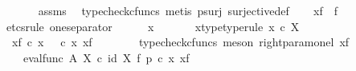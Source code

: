 \begin{isabellebody}
\ \ \ \ \isamarkupfalse%
\ assms\ \isamarkupfalse%
\ {\isacharparenleft}{\kern0pt}typecheck{\isacharunderscore}{\kern0pt}cfuncs{\isacharcomma}{\kern0pt}\ metis\ p{\isacharunderscore}{\kern0pt}surj\ surjective{\isacharunderscore}{\kern0pt}def{}{\isacharparenright}{\kern0pt}\isanewline
\ \ \isamarkupfalse%
\ {\isachardoublequoteopen}{\isasymphi}\isactrlbsub {\isacharbrackleft}{\kern0pt}{\isacharminus}{\kern0pt}{\isacharcomma}{\kern0pt}x{\isacharunderscore}{\kern0pt}f{\isacharbrackright}{\kern0pt}\isactrlesub \ {\isacharequal}{\kern0pt}\ f{\isachardoublequoteclose}\isanewline
\ \ \isamarkupfalse%
{\isacharparenleft}{\kern0pt}etcs{\isacharunderscore}{\kern0pt}rule\ one{\isacharunderscore}{\kern0pt}separator{\isacharparenright}{\kern0pt}\isanewline
\ \ \ \ \isamarkupfalse%
\ x\ \isanewline
\ \ \ \ \isamarkupfalse%
\ x{\isacharunderscore}{\kern0pt}type{\isacharbrackleft}{\kern0pt}type{\isacharunderscore}{\kern0pt}rule{\isacharbrackright}{\kern0pt}{\isacharcolon}{\kern0pt}\ {\isachardoublequoteopen}x\ {\isasymin}\isactrlsub c\ X{\isachardoublequoteclose}\isanewline
\ \ \ \ \isamarkupfalse%
\ {\isachardoublequoteopen}{\isasymphi}\isactrlbsub {\isacharbrackleft}{\kern0pt}{\isacharminus}{\kern0pt}{\isacharcomma}{\kern0pt}x{\isacharunderscore}{\kern0pt}f{\isacharbrackright}{\kern0pt}\isactrlesub \ {\isasymcirc}\isactrlsub c\ x\ {\isacharequal}{\kern0pt}\ {\isasymphi}\ {\isasymcirc}\isactrlsub c\ {\isasymlangle}x{\isacharcomma}{\kern0pt}\ x{\isacharunderscore}{\kern0pt}f{\isasymrangle}{\isachardoublequoteclose}\isanewline
\ \ \ \ \ \ \isamarkupfalse%
\ {\isacharparenleft}{\kern0pt}typecheck{\isacharunderscore}{\kern0pt}cfuncs{\isacharcomma}{\kern0pt}\ meson\ right{\isacharunderscore}{\kern0pt}param{\isacharunderscore}{\kern0pt}on{\isacharunderscore}{\kern0pt}el\ x{\isacharunderscore}{\kern0pt}f{\isacharparenright}{\kern0pt}\isanewline
\ \ \ \ \isamarkupfalse%
\ \isamarkupfalse%
\ {\isachardoublequoteopen}{\isachardot}{\kern0pt}{\isachardot}{\kern0pt}{\isachardot}{\kern0pt}\ {\isacharequal}{\kern0pt}\ {\isacharparenleft}{\kern0pt}{\isacharparenleft}{\kern0pt}eval{\isacharunderscore}{\kern0pt}func\ A\ X{\isacharparenright}{\kern0pt}\ {\isasymcirc}\isactrlsub c\ {\isacharparenleft}{\kern0pt}id\ X\ {\isasymtimes}\isactrlsub f\ p{\isacharparenright}{\kern0pt}{\isacharparenright}{\kern0pt}\ {\isasymcirc}\isactrlsub c\ {\isasymlangle}x{\isacharcomma}{\kern0pt}\ x{\isacharunderscore}{\kern0pt}f{\isasymrangle}{\isachardoublequoteclose}\isanewline

\end{isabellebody}

